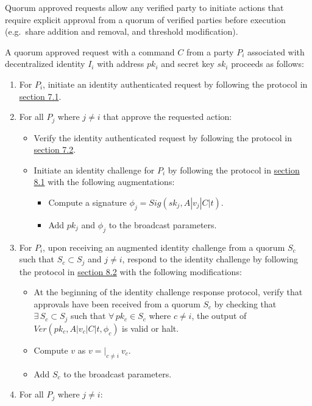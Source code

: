 \documentclass[
]{article}
\providecommand{\tightlist}{%
  \setlength{\itemsep}{0pt}\setlength{\parskip}{0pt}}
\begin{document}
Quorum approved requests allow any verified party to initiate actions
that require explicit approval from a quorum of verified parties before
execution (e.g.~share addition and removal, and threshold modification).

A quorum approved request with a command \(C\) from a party \(P_i\)
associated with decentralized identity \(I_i\) with address \(pk_i\) and
secret key \(sk_i\) proceeds as follows:

\begin{enumerate}
\def\labelenumi{\arabic{enumi}.}
\tightlist
\item
  For \(P_i\), initiate an identity authenticated request by following
  the protocol in
  \protect\hyperlink{identity-authed-request-initiation}{section 7.1}.
\item
  For all \(P_j\) where \(j \neq i\) that approve the requested action:

  \begin{itemize}
  \tightlist
  \item
    Verify the identity authenticated request by following the protocol
    in \protect\hyperlink{identity-authed-request-verification}{section
    7.2}.
  \item
    Initiate an identity challenge for \(P_i\) by following the protocol
    in \protect\hyperlink{identity-challenge-initiation}{section 8.1}
    with the following augmentations:

    \begin{itemize}
    \tightlist
    \item
      Compute a signature \(\phi _j = Sig(sk_j, A | v_j | C | t)\).
    \item
      Add \(pk_j\) and \(\phi _j\) to the broadcast parameters.
    \end{itemize}
  \end{itemize}
\item
  For \(P_i\), upon receiving an augmented identity challenge from a
  quorum \(S_c\) such that \(S_c \subset S_j\) and \(j \neq i\), respond
  to the identity challenge by following the protocol in
  \protect\hyperlink{identity-challenge-response}{section 8.2} with the
  following modifications:

  \begin{itemize}
  \tightlist
  \item
    At the beginning of the identity challenge response protocol, verify
    that approvals have been received from a quorum \(S_c\) by checking
    that \(\exists \, S_c \subset S_j\) such that
    \(\forall \, pk_c \in S_c\) where \(c \neq i\), the output of
    \(Ver(pk_c, A | v_c | C | t, \phi _c)\) is valid or halt.
  \item
    Compute \(v\) as \(v = | _{c \neq i} \: v_c\).
  \item
    Add \(S_c\) to the broadcast parameters.
  \end{itemize}
\item
  For all \(P_j\) where \(j \neq i\):


\end{enumerate}
\end{document}
